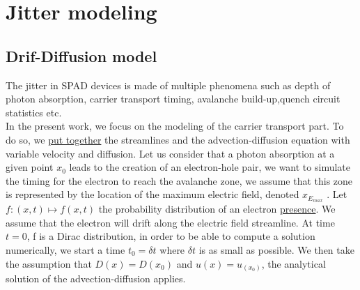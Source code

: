 \documentclass[10pt,a4paper,twocolumn]{article}
\begin{document}
\section{Jitter modeling}
\subsection{Drif-Diffusion model}
The jitter in SPAD devices is made of multiple phenomena such as depth of photon absorption, carrier transport timing, avalanche build-up,quench circuit statistics etc. \\In the present work, we focus on the modeling of the carrier transport part. To do so, we \underline{put together} the streamlines and the advection-diffusion equation with variable velocity and diffusion.
Let us consider that a photon absorption at a given point $x_0$ leads to the creation of an electron-hole pair, we want to simulate the timing for the electron to reach the avalanche zone, we assume that this zone is represented by the location of the maximum electric field, denoted $x_{E_{max}}$ . Let $f : (x,t) \mapsto f(x,t)$ the probability distribution of an electron \underline{presence}. We assume that the electron will drift along the electric field streamline. At time $t=0$, f is a Dirac distribution, in order to be able to compute a solution numerically, we start a time $t_0 = \delta t$ where $\delta t$ is as small as possible. We then take the assumption that $D(x) = D(x_0)$ and $u(x) = u_(x_0)$, the analytical solution of the advection-diffusion applies. 
\end{document}

